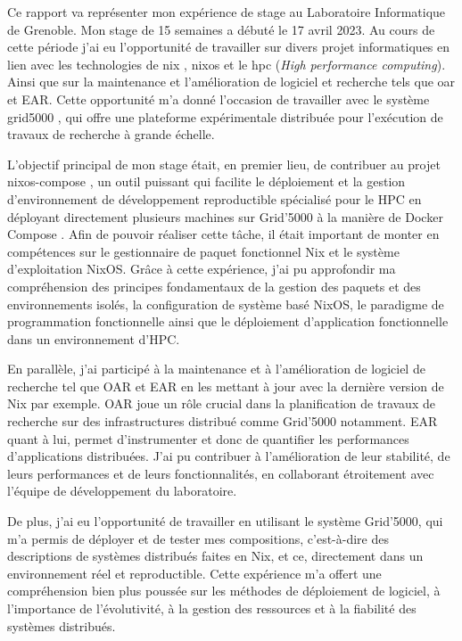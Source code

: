 \documentclass[a4paper,french,12pt, titlepage]{article}
\begin{document}
Ce rapport va représenter mon expérience de stage au Laboratoire
Informatique de Grenoble. Mon stage de 15 semaines a débuté le 17 avril
2023. Au cours de cette période j'ai eu l'opportunité de travailler sur
divers projet informatiques en lien avec les technologies de \Gls{nix}
\cite{nix2004}, \Gls{nixos} \cite{nixos2010} et le \Gls{hpc} (\emph{High
performance computing}). Ainsi que sur la maintenance et l'amélioration
de logiciel et recherche tels que \Gls{oar} \cite{oar2005} et EAR. Cette
opportunité m'a donné l'occasion de travailler avec le système
\Gls{grid5000} \cite{grid5000}, qui offre une plateforme expérimentale
distribuée pour l'exécution de travaux de recherche à grande
échelle.\newline

L'objectif principal de mon stage était, en premier lieu, de contribuer
au projet \Gls{nixos-compose} \cite{nixoscompose2022}, un outil puissant
qui facilite le déploiement et la gestion d'environnement de
développement reproductible spécialisé pour le HPC en déployant
directement plusieurs machines sur Grid'5000 à la manière de Docker
Compose \cite{docker2017}. Afin de pouvoir réaliser cette tâche, il
était important de monter en compétences sur le gestionnaire de paquet
fonctionnel Nix et le système d'exploitation NixOS. Grâce à cette
expérience, j'ai pu approfondir ma compréhension des principes
fondamentaux de la gestion des paquets et des environnements isolés, la
configuration de système basé NixOS, le paradigme de programmation
fonctionnelle ainsi que le déploiement d'application fonctionnelle dans
un environnement d'HPC.\newline

En parallèle, j'ai participé à la maintenance et à l'amélioration de
logiciel de recherche tel que OAR et EAR en les mettant à jour avec la
dernière version de Nix par exemple. OAR joue un rôle crucial dans la
planification de travaux de recherche sur des infrastructures distribué
comme Grid'5000 notamment. EAR quant à lui, permet d'instrumenter et
donc de quantifier les performances d'applications distribuées. J'ai pu
contribuer à l'amélioration de leur stabilité, de leurs performances et
de leurs fonctionnalités, en collaborant étroitement avec l'équipe de
développement du laboratoire.\newline

De plus, j'ai eu l'opportunité de travailler en utilisant le système
Grid'5000, qui m'a permis de déployer et de tester mes
\glspl{composition}, c'est-à-dire des descriptions de systèmes
distribués faites en Nix, et ce, directement dans un environnement réel
et reproductible. Cette expérience m'a offert une compréhension bien
plus poussée sur les méthodes de déploiement de logiciel, à l'importance
de l'évolutivité, à la gestion des ressources et à la fiabilité des
systèmes distribués.\newline
\end{document}
